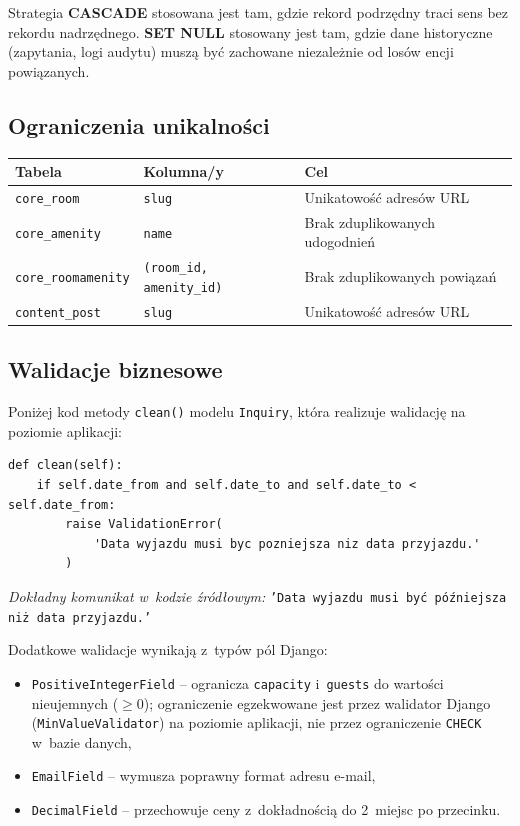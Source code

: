 \documentclass[12pt,a4paper]{article}
\begin{document}
Strategia \textbf{CASCADE} stosowana jest tam, gdzie rekord podrzędny traci
sens bez rekordu nadrzędnego. \textbf{SET NULL} stosowany jest tam, gdzie
dane historyczne (zapytania, logi audytu) muszą być zachowane niezależnie od
losów encji powiązanych.

\subsection{Ograniczenia unikalności}

\begin{center}
\begin{tabular}{lll}
\toprule
\textbf{Tabela} & \textbf{Kolumna/y} & \textbf{Cel} \\
\midrule
\texttt{core\_room} & \texttt{slug} & Unikatowość adresów URL \\
\texttt{core\_amenity} & \texttt{name} & Brak zduplikowanych udogodnień \\
\texttt{core\_roomamenity} & \texttt{(room\_id, amenity\_id)} & Brak zduplikowanych powiązań \\
\texttt{content\_post} & \texttt{slug} & Unikatowość adresów URL \\
\bottomrule
\end{tabular}
\end{center}

\subsection{Walidacje biznesowe}

Poniżej kod metody \texttt{clean()} modelu \texttt{Inquiry}, która realizuje
walidację na poziomie aplikacji:

\begin{lstlisting}[style=pythonstyle, caption={Walidacja dat w modelu Inquiry (models.py)}]
def clean(self):
    if self.date_from and self.date_to and self.date_to < self.date_from:
        raise ValidationError(
            'Data wyjazdu musi byc pozniejsza niz data przyjazdu.'
        )
\end{lstlisting}

\noindent\textit{Dokładny komunikat w~kodzie źródłowym:}
\texttt{'Data wyjazdu musi być późniejsza niż data przyjazdu.'}

Dodatkowe walidacje wynikają z~typów pól Django:
\begin{itemize}[nosep]
  \item \texttt{PositiveIntegerField} -- ogranicza \texttt{capacity} i~\texttt{guests}
    do wartości nieujemnych ($\geq 0$); ograniczenie egzekwowane jest przez
    walidator Django (\texttt{MinValueValidator}) na poziomie aplikacji, nie
    przez ograniczenie \texttt{CHECK} w~bazie danych,
  \item \texttt{EmailField} -- wymusza poprawny format adresu e-mail,
  \item \texttt{DecimalField} -- przechowuje ceny z~dokładnością do 2~miejsc po przecinku.
\end{itemize}
\end{document}
